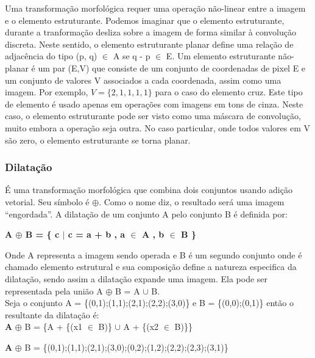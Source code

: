 \documentclass[letterpaper, 10 pt, conference]{ieeeconf}  %
\begin{document}
Uma transformação morfológica requer uma operação não-linear entre a imagem e o
elemento estruturante. Podemos imaginar que o elemento estruturante, durante a
tranformação desliza sobre a imagem de forma similar à convolução
discreta.
Neste sentido, o elemento estruturante planar define uma relação de adjacência do tipo (p, q) $\in$ A se q - p $\in$ E. Um elemento
estruturante não-planar é um par (E,V) que consiste de um conjunto de
coordenadas de pixel E e um conjunto de valores V associados a cada coordenada,
assim como uma imagem. Por exemplo, $ V = \{2, 1, 1, 1, 1\} $ para o caso do
elemento cruz. Este tipo de elemento é usado apenas em operações com imagens em
tons de cinza. Neste caso, o elemento estruturante pode ser visto como uma
máscara de convolução, muito embora a operação seja outra. No caso particular,
onde todos valores em V são zero, o elemento estruturante se torna planar.\\

\subsubsection{Dilatação}

É uma transformação morfológica que combina dois conjuntos usando adição
vetorial. Seu símbolo é $\oplus$. Como o nome diz, o resultado será uma imagem
“engordada”. A dilatação de um conjunto A pelo conjunto B é definida por:

\begin{center}
\textbf {A $\oplus$ B = \{ c $\mid$ c = a + b , a $\in$ A , b $\in$ B \}} \\
\end{center}

Onde A representa a imagem sendo operada e B é um segundo conjunto onde é
chamado elemento estrutural e sua composição define a natureza especifica da
dilatação, sendo assim a dilatação expande uma imagem. Ela pode ser representada
pela união A $\oplus$ B = A $\cup$ B.\\

Seja o conjunto A = \{(0,1);(1,1);(2,1);(2,2);(3,0)\} e B = \{(0,0);(0,1)\}
então o resultante da dilatação é:\\

\textbf A $\oplus$ B = \{A + \{(x1 $\in$ B)\} $\cup$ A + \{(x2 $\in$ B)\}\}

\textbf A $\oplus$ B =
\{(0,1);(1,1);(2,1);(3,0);(0,2);(1,2);(2,2);(2,3);(3,1)\}\\
\end{document}
